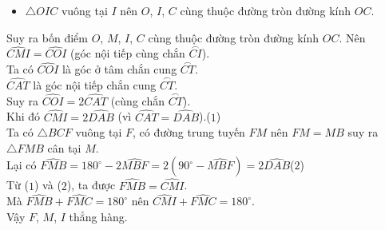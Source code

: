 \begin{bt}[3,0 điểm]
{\begin{enumerate}
\begin{itemize}
				\item $\triangle OIC$ vuông tại $I$ nên $O$, $I$, $C$ cùng thuộc đường tròn đường kính $OC$.
			\end{itemize}
			Suy ra bốn điểm $O$, $M$, $I$, $C$ cùng thuộc đường tròn đường kính $OC$.
			Nên $\widehat{CMI}=\widehat{COI}$ (góc nội tiếp cùng chắn $\stackrel\frown{CI}$).\\
			Ta có $\widehat{COI}$ là góc ở tâm chắn cung $\stackrel\frown{CT}$.\\
			$\widehat{CAT}$ là góc nội tiếp chắn cung $\stackrel\frown{CT}$.\\
			Suy ra $\widehat{COI}=2\widehat{CAT}$ (cùng chắn $\stackrel\frown{CT}$).\\
			Khi đó $\widehat{CMI}=2\widehat{DAB}$ (vì $\widehat{CAT}=\widehat{DAB}$).\quad ($1$)\\
			Ta có $\triangle BCF$ vuông tại $F$, có đường trung tuyến $FM$ nên $FM=MB$ suy ra $\triangle FMB$ cân tại $M$.\\
			Lại có $\widehat{FMB}=180^{\circ}-2\widehat{MBF}=2\left(90^{\circ}-\widehat{MBF}\right)=2\widehat{DAB}$\quad ($2$)\\
			Từ ($1$) và ($2$), ta được $\widehat{FMB}=\widehat{CMI}$.\\
			Mà $\widehat{FMB}+\widehat{FMC}=180^{\circ}$ nên $\widehat{CMI}+\widehat{FMC}=180^{\circ}$.\\
			Vậy $F$, $M$, $I$ thẳng hàng.
			\end{enumerate}
	}
\end{bt} 